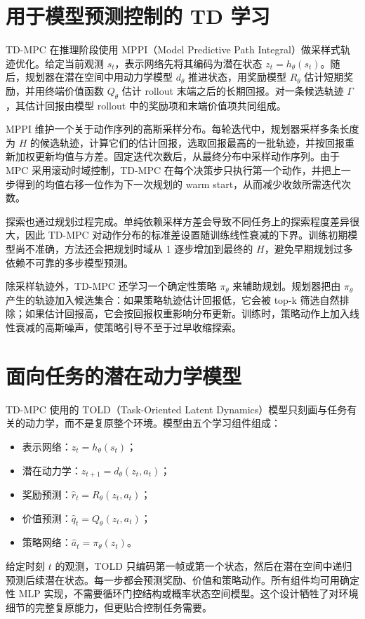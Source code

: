\documentclass[10pt]{article}
\begin{document}
\section{用于模型预测控制的 TD 学习}
TD-MPC 在推理阶段使用 MPPI（Model Predictive Path Integral）做采样式轨迹优化。给定当前观测 $s_t$，表示网络先将其编码为潜在状态 $z_t=h_\theta(s_t)$。随后，规划器在潜在空间中用动力学模型 $d_\theta$ 推进状态，用奖励模型 $R_\theta$ 估计短期奖励，并用终端价值函数 $Q_\theta$ 估计 rollout 末端之后的长期回报。对一条候选轨迹 $\Gamma$，其估计回报由模型 rollout 中的奖励项和末端价值项共同组成。

MPPI 维护一个关于动作序列的高斯采样分布。每轮迭代中，规划器采样多条长度为 $H$ 的候选轨迹，计算它们的估计回报，选取回报最高的一批轨迹，并按回报重新加权更新均值与方差。固定迭代次数后，从最终分布中采样动作序列。由于 MPC 采用滚动时域控制，TD-MPC 在每个决策步只执行第一个动作，并把上一步得到的均值右移一位作为下一次规划的 warm start，从而减少收敛所需迭代次数。

探索也通过规划过程完成。单纯依赖采样方差会导致不同任务上的探索程度差异很大，因此 TD-MPC 对动作分布的标准差设置随训练线性衰减的下界。训练初期模型尚不准确，方法还会把规划时域从 1 逐步增加到最终的 $H$，避免早期规划过多依赖不可靠的多步模型预测。

除采样轨迹外，TD-MPC 还学习一个确定性策略 $\pi_\theta$ 来辅助规划。规划器把由 $\pi_\theta$ 产生的轨迹加入候选集合：如果策略轨迹估计回报低，它会被 top-k 筛选自然排除；如果估计回报高，它会按回报权重影响分布更新。训练时，策略动作上加入线性衰减的高斯噪声，使策略引导不至于过早收缩探索。

\section{面向任务的潜在动力学模型}
TD-MPC 使用的 TOLD（Task-Oriented Latent Dynamics）模型只刻画与任务有关的动力学，而不是复原整个环境。模型由五个学习组件组成：
\begin{itemize}
  \item 表示网络：$z_t=h_\theta(s_t)$；
  \item 潜在动力学：$z_{t+1}=d_\theta(z_t,a_t)$；
  \item 奖励预测：$\hat r_t=R_\theta(z_t,a_t)$；
  \item 价值预测：$\hat q_t=Q_\theta(z_t,a_t)$；
  \item 策略网络：$\hat a_t=\pi_\theta(z_t)$。
\end{itemize}

给定时刻 $t$ 的观测，TOLD 只编码第一帧或第一个状态，然后在潜在空间中递归预测后续潜在状态。每一步都会预测奖励、价值和策略动作。所有组件均可用确定性 MLP 实现，不需要循环门控结构或概率状态空间模型。这个设计牺牲了对环境细节的完整复原能力，但更贴合控制任务需要。
\end{document}
